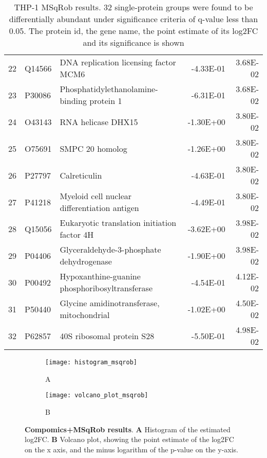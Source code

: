 \begin{table}[!h]
\begin{tabular}{rllrr}
  22 & Q14566 & DNA replication licensing factor MCM6 & -4.33E-01 & 3.68E-02 \\ 
  23 & P30086 & Phosphatidylethanolamine-binding protein 1 & -6.31E-01 & 3.68E-02 \\ 
  24 & O43143 & RNA helicase DHX15 & -1.30E+00 & 3.80E-02 \\ 
  25 & O75691 & SMPC 20 homolog & -1.26E+00 & 3.80E-02 \\ 
  26 & P27797 & Calreticulin & -4.63E-01 & 3.80E-02 \\ 
  27 & P41218 & Myeloid cell nuclear differentiation antigen & -4.49E-01 & 3.80E-02 \\ 
  28 & Q15056 & Eukaryotic translation initiation factor 4H & -3.62E+00 & 3.98E-02 \\ 
  29 & P04406 & Glyceraldehyde-3-phosphate dehydrogenase & -1.90E+00 & 3.98E-02 \\ 
  30 & P00492 & Hypoxanthine-guanine phosphoribosyltransferase & -4.54E-01 & 4.12E-02 \\ 
  31 & P50440 & Glycine amidinotransferase, mitochondrial & -1.02E+00 & 4.50E-02 \\ 
  32 & P62857 & 40S ribosomal protein S28 & -5.50E-01 & 4.98E-02 \\ 
   \hline
\end{tabular}
\caption{THP-1 MSqRob results. 32 single-protein groups were found to be differentially abundant under significance criteria of q-value less than 0.05. The protein id, the gene name, the point estimate of its \ac{log2FC} and its significance is shown}
\label{tab:thp1_rob_results}
\end{table}


\begin{figure}[!h]
\begin{subfigure}{0.45\textwidth}
\centering
\caption*{A}
\texttt{[image: histogram\_msqrob]}
\end{subfigure}
\begin{subfigure}{0.45\textwidth}
\centering
\caption*{B}
\texttt{[image: volcano\_plot\_msqrob]}
\end{subfigure}
\caption[Compomics+MSqRob results on THP-1 dataset]{\textbf{Compomics+MSqRob results}. \textbf{A} Histogram of the estimated \ac{log2FC}. \textbf{B} Volcano plot, showing the point estimate of the \ac{log2FC} on the x axis, and the minus logarithm of the p-value on the y-axis.}
\label{fig:compomics_rob}
\end{figure}



